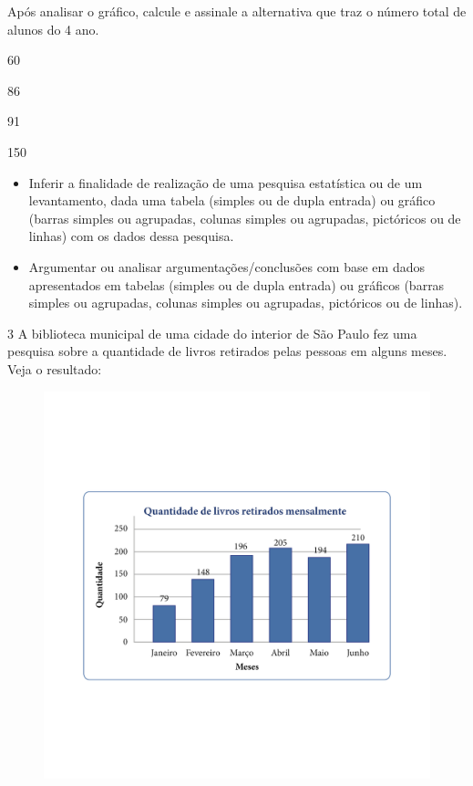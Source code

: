 Após analisar o gráfico, calcule e assinale a alternativa que traz o
número total de alunos do 4 ano.

\begin{escolha}
\item
  60
\item
  86
\item
  91
\item
  150
\end{escolha}



\begin{itemize}
\item Inferir a finalidade de realização de uma pesquisa estatística ou de
um levantamento, dada uma tabela (simples ou de dupla entrada) ou
gráfico (barras simples ou agrupadas, colunas simples ou agrupadas,
pictóricos ou de linhas) com os dados dessa pesquisa.

\item Argumentar ou analisar argumentações/conclusões com base em dados
apresentados em tabelas (simples ou de dupla entrada) ou gráficos
(barras simples ou agrupadas, colunas simples ou agrupadas, pictóricos
ou de linhas).
\end{itemize}


\num{3} A biblioteca municipal de uma cidade do interior de São Paulo fez
uma pesquisa sobre a quantidade de livros retirados pelas pessoas em
alguns meses. Veja o resultado:

\begin{figure}[htpb!]
\includegraphics[width=\textwidth]{../ilustracoes/MAT5/SAEB_5ANO_MAT_figura111.png}
\end{figure}

